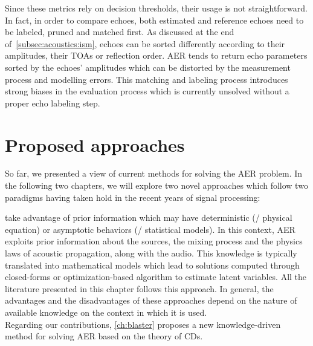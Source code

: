 \mynewline
Since these metrics rely on decision thresholds, their usage is not straightforward.
In fact, in order to compare echoes, both estimated and reference echoes need to be labeled, pruned and matched first.
As discussed at the end of~\cref{subsec:acoustics:ism}, echoes can be sorted differently according to their amplitudes, their \acp{TOA} or reflection order.
\ac{AER} tends to return echo parameters sorted by the echoes' amplitudes which can be distorted by the measurement process and modelling errors.
This matching and labeling process introduces strong biases in the evaluation process which is currently unsolved without a proper echo labeling step.

\section{Proposed approaches}
So far, we presented a view of current methods for solving the \ac{AER} problem.
In the following two chapters, we will explore two novel approaches which follow two paradigms having taken hold in the recent years of signal processing:

 take advantage of prior information which may have deterministic (\eg/ physical equation) or asymptotic behaviors (\eg/ statistical models).
In this context, \ac{AER} exploits prior information about the sources, the mixing process and the physics laws of acoustic propagation, along with the audio.
This knowledge is typically translated into mathematical models which lead to solutions computed through closed-forms or optimization-based algorithm to estimate latent variables.
All the literature presented in this chapter follows this approach.
In general, the advantages and the disadvantages of these approaches depend on the nature of available knowledge on the context in which it is used.
\\Regarding our contributions, \cref{ch:blaster} proposes a new knowledge-driven method for solving \ac{AER} based on the theory of \acfp{CD}.

